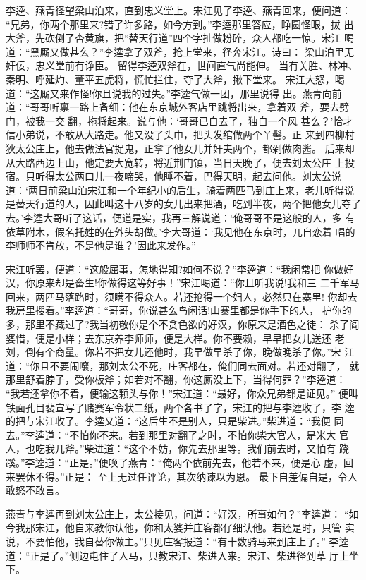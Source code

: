 李逵、燕青径望梁山泊来，直到忠义堂上。宋江见了李逵、燕青回来，便问道：
“兄弟，你两个那里来?错了许多路，如今方到。”李逵那里答应，睁圆怪眼，拔
出大斧，先砍倒了杏黄旗，把“替天行道”四个字扯做粉碎，众人都吃一惊。宋江
喝道：“黑厮又做甚么？”李逵拿了双斧，抢上堂来，径奔宋江。诗曰：
梁山泊里无奸佞，忠义堂前有诤臣。
留得李逵双斧在，世间直气尚能伸。
当有关胜、林冲、秦明、呼延灼、董平五虎将，慌忙拦住，夺了大斧，揪下堂来。
宋江大怒，喝道：“这厮又来作怪!你且说我的过失。”李逵气做一团，那里说得
出。燕青向前道：“哥哥听禀一路上备细：他在东京城外客店里跳将出来，拿着双
斧，要去劈门，被我一交翻，拖将起来。说与他：‘哥哥已自去了，独自一个风
甚么？’恰才信小弟说，不敢从大路走。他又没了头巾，把头发绾做两个丫髻。正
来到四柳村狄太公庄上，他去做法官捉鬼，正拿了他女儿并奸夫两个，都剁做肉酱。
后来却从大路西边上山，他定要大宽转，将近荆门镇，当日天晚了，便去刘太公庄
上投宿。只听得太公两口儿一夜啼哭，他睡不着，巴得天明，起去问他。刘太公说
道：‘两日前梁山泊宋江和一个年纪小的后生，骑着两匹马到庄上来，老儿听得说
是替天行道的人，因此叫这十八岁的女儿出来把酒，吃到半夜，两个把他女儿夺了
去。’李逵大哥听了这话，便道是实，我再三解说道：‘俺哥哥不是这般的人，多
有依草附木，假名托姓的在外头胡做。’李大哥道：‘我见他在东京时，兀自恋着
唱的李师师不肯放，不是他是谁？’因此来发作。”

宋江听罢，便道：“这般屈事，怎地得知?如何不说？”李逵道：“我闲常把
你做好汉，你原来却是畜生!你做得这等好事！”宋江喝道：“你且听我说!我和三
二千军马回来，两匹马落路时，须瞒不得众人。若还抢得一个妇人，必然只在寨里!
你却去我房里搜看。”李逵道：“哥哥，你说甚么鸟闲话!山寨里都是你手下的人，
护你的多，那里不藏过了?我当初敬你是个不贪色欲的好汉，你原来是酒色之徒：
杀了阎婆惜，便是小样；去东京养李师师，便是大样。你不要赖，早早把女儿送还
老刘，倒有个商量。你若不把女儿还他时，我早做早杀了你，晚做晚杀了你。”宋
江道：“你且不要闹嚷，那刘太公不死，庄客都在，俺们同去面对。若还对翻了，
就那里舒着脖子，受你板斧；如若对不翻，你这厮没上下，当得何罪？”李逵道：
“我若还拿你不着，便输这颗头与你！”宋江道：“最好，你众兄弟都是证见。”
便叫铁面孔目裴宣写了赌赛军令状二纸，两个各书了字，宋江的把与李逵收了，李
逵的把与宋江收了。李逵又道：“这后生不是别人，只是柴进。”柴进道：“我便
同去。”李逵道：“不怕你不来。若到那里对翻了之时，不怕你柴大官人，是米大
官人，也吃我几斧。”柴进道：“这个不妨，你先去那里等。我们前去时，又怕有
跷蹊。”李逵道：“正是。”便唤了燕青：“俺两个依前先去，他若不来，便是心
虚，回来罢休不得。”正是：
至上无过任评论，其次纳谏以为恩。
最下自差偏自是，令人敢怒不敢言。

燕青与李逵再到刘太公庄上，太公接见，问道：“好汉，所事如何？”李逵道：
“如今我那宋江，他自来教你认他，你和太婆并庄客都仔细认他。若还是时，只管
实说，不要怕他，我自替你做主。”只见庄客报道：“有十数骑马来到庄上了。”
李逵道：“正是了。”侧边屯住了人马，只教宋江、柴进入来。宋江、柴进径到草
厅上坐下。

